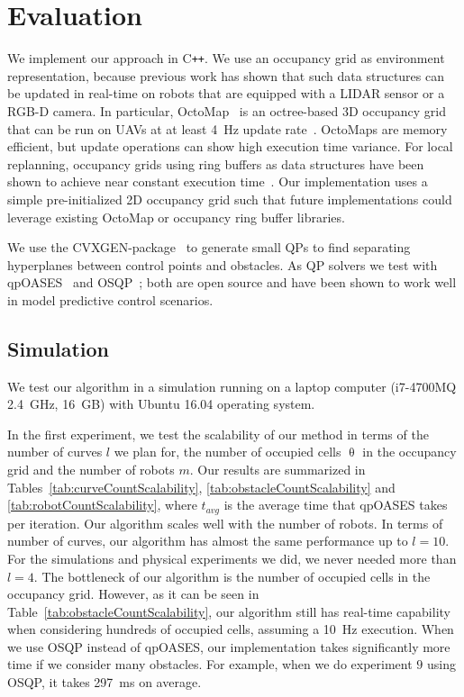 \documentclass{svproc}
\begin{document}
\section{Evaluation}

We implement our approach in C\texttt{++}.
We use an occupancy grid as environment representation, because previous work has shown that such data structures can be updated in real-time on robots that are equipped with a LIDAR sensor or a RGB-D camera.
In particular, OctoMap~\cite{octomap} is an octree-based 3D occupancy grid that can be run on UAVs at at least \SI{4}{Hz} update rate~\cite{replanning-eth}.
OctoMaps are memory efficient, but update operations can show high execution time variance.
For local replanning, occupancy grids using ring buffers as data structures have been shown to achieve near constant execution time~\cite{replanning-usenko}.
Our implementation uses a simple pre-initialized 2D occupancy grid such that future implementations could leverage existing OctoMap or occupancy ring buffer libraries.

We use the CVXGEN-package~\cite{cvxgen} to generate small QPs to find separating hyperplanes between control points and obstacles.
As QP solvers we test with qpOASES~\cite{qpOASES} and OSQP~\cite{osqp}; both are open source and have been shown to work well in model predictive control scenarios. 


\subsection{Simulation}
We test our algorithm in a simulation running on a laptop computer (i7-4700MQ \SI{2.4}{GHz}, \SI{16}{GB}) with Ubuntu 16.04 operating system.

In the first experiment, we test the scalability of our method in terms of the number of curves $l$ we plan for, the number of occupied cells $\uptheta$ in the occupancy grid and the number of robots $m$.
Our results are summarized in Tables~\ref{tab:curveCountScalability}, \ref{tab:obstacleCountScalability} and \ref{tab:robotCountScalability}, where $t_{avg}$ is the average time that qpOASES takes per iteration.
Our algorithm scales well with the number of robots.
In terms of number of curves, our algorithm has almost the same performance up to $l=10$. For the simulations and physical experiments we did, we never needed more than $l=4$.
The bottleneck of our algorithm is the number of occupied cells in the occupancy grid. However, as it can be seen in Table~\ref{tab:obstacleCountScalability}, our algorithm still has real-time capability when considering hundreds of occupied cells, assuming a \SI{10}{Hz} execution.
When we use OSQP instead of qpOASES, our implementation takes significantly more time if we consider many obstacles.
For example, when we do experiment $9$ using OSQP, it takes \SI{297}{ms} on average.
\end{document}

